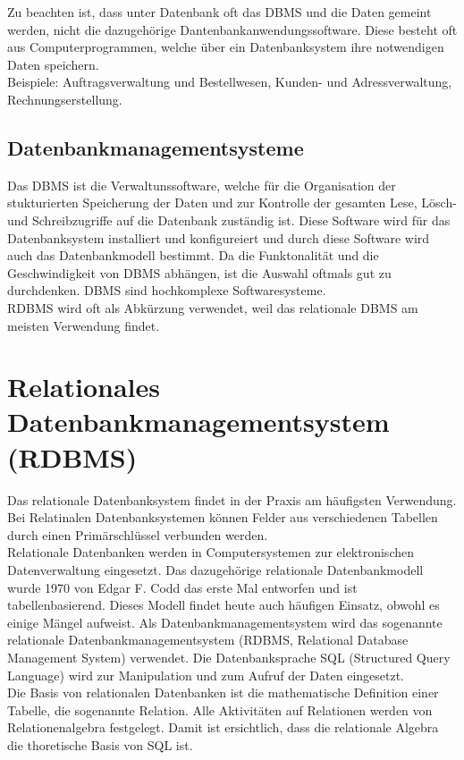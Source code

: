 \documentclass[12pt,a4paper]{report}
\begin{document}
\begin{onehalfspace}
Zu beachten ist, dass unter Datenbank oft das DBMS und die Daten gemeint werden, nicht die dazugehörige Dantenbankanwendungssoftware. Diese besteht oft aus Computerprogrammen, welche über ein Datenbanksystem ihre notwendigen Daten speichern.
\\Beispiele: Auftragsverwaltung und Bestellwesen, Kunden- und Adressverwaltung, Rechnungserstellung.

\subsection{Datenbankmanagementsysteme}
Das DBMS ist die Verwaltunssoftware, welche für die Organisation der stukturierten  Speicherung der Daten und zur Kontrolle der gesamten Lese, Lösch- und Schreibzugriffe auf die Datenbank zuständig ist.
Diese Software wird für das Datenbanksystem installiert und konfigureiert und durch diese Software wird auch das Datenbankmodell bestimmt.
Da die Funktonalität und die Geschwindigkeit von DBMS abhängen, ist die Auswahl oftmals gut zu durchdenken.
DBMS sind hochkomplexe Softwaresysteme.\\

RDBMS wird oft als Abkürzung verwendet, weil das relationale DBMS am meisten Verwendung findet.

\section{Relationales Datenbankmanagementsystem (RDBMS)}
Das relationale Datenbanksystem findet in der Praxis am häufigsten Verwendung.
Bei Relatinalen Datenbanksystemen können Felder aus verschiedenen Tabellen durch einen Primärschlüssel verbunden werden.\\

Relationale Datenbanken werden in Computersystemen zur elektronischen Datenverwaltung eingesetzt. Das dazugehörige relationale Datenbankmodell wurde 1970 von Edgar F. Codd das erste Mal entworfen und ist tabellenbasierend. Dieses Modell findet heute auch häufigen Einsatz, obwohl es einige Mängel aufweist. Als Datenbankmanagementsystem wird das sogenannte relationale Datenbankmanagementsystem (RDBMS, Relational Database Management System) verwendet. Die Datenbanksprache SQL (Structured Query Language) wird zur Manipulation und zum Aufruf der Daten eingesetzt.\\

Die Basis von relationalen Datenbanken ist die mathematische Definition einer Tabelle, die sogenannte Relation. Alle Aktivitäten auf Relationen werden von Relationenalgebra festgelegt. Damit ist ersichtlich, dass die relationale Algebra die thoretische Basis von SQL ist.


\end{onehalfspace}
\end{document}

